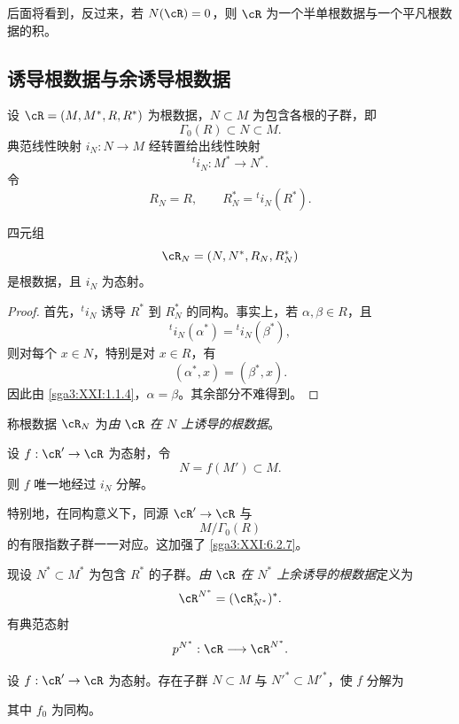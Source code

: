 后面将看到，反过来，若 \(N(\cR)=0\)，则 \(\cR\) 为一个半单根数据与一个平凡根数据的积。

\subsection{诱导根数据与余诱导根数据}\label{sga3:XXI:6.5}

设 \(\cR=(M,M^\ast,R,R^\ast)\) 为根数据，\(N\subset M\) 为包含各根的子群，即
\[
 \Gamma_0(R)\subset N\subset M.
\]
典范线性映射 \(i_N:N\to M\) 经转置给出线性映射
\[
 {}^ti_N:M^\ast\longrightarrow N^\ast.
\]
令
\[
 R_N=R,
 \qquad
 R_N^\ast={}^ti_N(R^\ast).
\]

\begin{lemma}\label{sga3:XXI:6.5.1}
四元组
\[
 \cR_N=(N,N^\ast,R_N,R_N^\ast)
\]
是根数据，且 \(i_N\) 为态射。
\end{lemma}

\begin{proof}
首先，\({}^ti_N\) 诱导 \(R^\ast\) 到 \(R_N^\ast\) 的同构。事实上，若 \(\alpha,\beta\in R\)，且
\[
 {}^ti_N(\alpha^\ast)={}^ti_N(\beta^\ast),
\]
则对每个 \(x\in N\)，特别是对 \(x\in R\)，有
\[
 (\alpha^\ast,x)=(\beta^\ast,x).
\]
因此由 \ref{sga3:XXI:1.1.4}，\(\alpha=\beta\)。其余部分不难得到。
\end{proof}

\begin{definition}\label{sga3:XXI:6.5.2}
称根数据 \(\cR_N\) 为\emph{由 \(\cR\) 在 \(N\) 上诱导的根数据}。
\end{definition}

\begin{lemma}\label{sga3:XXI:6.5.3}
设 \(f:\cR'\to\cR\) 为态射，令
\[
 N=f(M')\subset M.
\]
则 \(f\) 唯一地经过 \(i_N\) 分解。
\end{lemma}

特别地，在同构意义下，同源 \(\cR'\to\cR\) 与
\[
 M/\Gamma_0(R)
\]
的有限指数子群一一对应。这加强了 \ref{sga3:XXI:6.2.7}。

现设 \(N^\ast\subset M^\ast\) 为包含 \(R^\ast\) 的子群。\emph{由 \(\cR\) 在 \(N^\ast\) 上余诱导的根数据}定义为
\[
 \cR^{N^\ast}=(\cR^\ast_{N^\ast})^\ast.
\]
有典范态射
\[
 p^{N^\ast}:\cR\longrightarrow\cR^{N^\ast}.
\]

\begin{lemma}\label{sga3:XXI:6.5.4}
设 \(f:\cR'\to\cR\) 为态射。存在子群 \(N\subset M\) 与 \(N'^\ast\subset M'^\ast\)，使 \(f\) 分解为
\begin{center}
\end{center}
其中 \(f_0\) 为同构。
\end{lemma}

